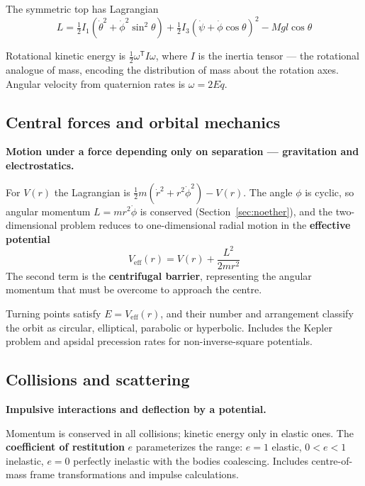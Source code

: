 \documentclass[11pt,a4paper]{article}
\begin{document}
The symmetric top has Lagrangian
\begin{equation}
L = \tfrac{1}{2}I_1\!\left(\dot\theta^2 + \dot\phi^2\sin^2\theta\right)
  + \tfrac{1}{2}I_3\!\left(\dot\psi + \dot\phi\cos\theta\right)^2 - Mgl\cos\theta
\end{equation}

Rotational kinetic energy is $\tfrac{1}{2}\omega^{\mathsf{T}} I \omega$, where $I$ is the inertia
tensor --- the rotational analogue of mass, encoding the distribution of mass about the rotation
axes. Angular velocity from quaternion rates is $\omega = 2E\dot q$.

\subsection{Central forces and orbital mechanics}

\textbf{Motion under a force depending only on separation --- gravitation and electrostatics.}

For $V(r)$ the Lagrangian is $\tfrac{1}{2}m(\dot r^2 + r^2\dot\phi^2) - V(r)$. The angle $\phi$ is
cyclic, so angular momentum $L = mr^2\dot\phi$ is conserved (Section~\ref{sec:noether}), and the
two-dimensional problem reduces to one-dimensional radial motion in the \textbf{effective potential}
\begin{equation}
V_{\mathrm{eff}}(r) = V(r) + \frac{L^2}{2mr^2}
\end{equation}
The second term is the \textbf{centrifugal barrier}, representing the angular momentum that must be
overcome to approach the centre.

Turning points satisfy $E = V_{\mathrm{eff}}(r)$, and their number and arrangement classify the orbit
as circular, elliptical, parabolic or hyperbolic. Includes the Kepler problem and apsidal precession
rates for non-inverse-square potentials.

\subsection{Collisions and scattering}

\textbf{Impulsive interactions and deflection by a potential.}

Momentum is conserved in all collisions; kinetic energy only in elastic ones. The \textbf{coefficient
of restitution} $e$ parameterizes the range: $e = 1$ elastic, $0 < e < 1$ inelastic, $e = 0$
perfectly inelastic with the bodies coalescing. Includes centre-of-mass frame transformations and
impulse calculations.
\end{document}
